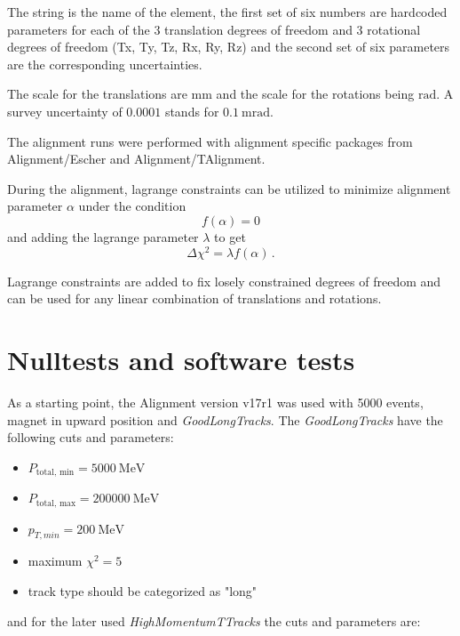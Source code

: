 The string is the name of the element, the first set of six numbers are hardcoded parameters for each of the 3 translation degrees of freedom and 3 rotational degrees of freedom (Tx, Ty, Tz, Rx, Ry, Rz) and the second set of six parameters are the corresponding uncertainties.

The scale for the translations are $\si{\milli\metre}$ and the scale for the rotations being $\si{\radian}$. A survey uncertainty of $\num{0.0001}$ stands for $\SI{0.1}{\milli\radian}$.

The alignment runs were performed with alignment specific packages from Alignment/Escher and Alignment/TAlignment\cite{align}.

During the alignment, lagrange constraints can be utilized to minimize alignment
parameter $\alpha $ under the condition
\begin{equation}
  f(\alpha) = 0
\end{equation}
and adding the lagrange parameter $\lambda$ to get
\begin{equation}
  \Delta \chi^2 = \lambda f(\alpha)\,.
\end{equation}

Lagrange constraints are added to fix losely constrained degrees of freedom and can be used for any linear combination of translations and rotations.

\section{Nulltests and software tests}

As a starting point, the Alignment version v17r1 was used with 5000 events, magnet in upward position and \textit{GoodLongTracks}.
The \textit{GoodLongTracks} have the following cuts and parameters:
\begin{itemize}
  \item $P_{\text{total, min}} = \SI{5000}{\mega\electronvolt}$ %
  \item $P_{\text{total, max}} = \SI{200000}{\mega\electronvolt}$ %
  \item $p_{T, min} = \SI{200}{\mega\electronvolt}$ %
  \item maximum $\chi^2 = 5$
  \item track type should be categorized as "long"
\end{itemize}

and for the later used \textit{HighMomentumTTracks} the cuts and parameters are:


